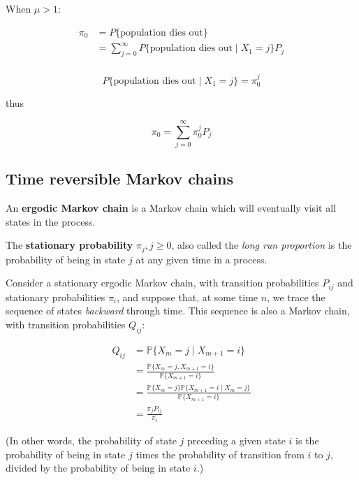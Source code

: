 \documentclass{article}
\newcommand\Prob[1]{\mathbb P\{#1\}}
\begin{document}
When $\mu > 1$:

\begin{align*}
    \pi_0 & = P\{\text{population dies out}\} \\
          & = \sum_{j=0}^\infty
          P\{\text{population dies out} \mid X_1 = j\} P_j \\
\end{align*}

\[
    P\{\text{population dies out} \mid X_1 = j\}
    = \pi_0^j
\]

thus

\[
    \pi_0 = \sum_{j=0}^\infty \pi_0^j P_j
\]


\subsection{Time reversible Markov chains}

\begin{definition}
    An \textbf{ergodic Markov chain} is a Markov chain which will
    eventually visit all states in the process.
\end{definition}

\begin{definition}
    The \textbf{stationary probability} $\pi_j, j \ge 0$, also called
    the \emph{long run proportion} is the probability of being in state
    $j$ at any given time in a process.
\end{definition}

Consider a stationary ergodic Markov chain, with transition
probabilities $P_{ij}$ and stationary probabilities $\pi_i$, and suppose
that, at some time $n$, we trace the sequence of states \emph{backward}
through time.  This sequence is also a Markov chain, with transition
probabilities $Q_{ij}$:

\begin{align*}
    Q_{ij} &= \Prob{X_m = j \mid X_{m+1} = i} \\
           &= \frac{\Prob{X_m = j, X_{m+1} = i}}
           {\Prob{X_{m+1} = i}} \\
           &= \frac{\Prob{X_m = j} \Prob{X_{m+1} = i \mid X_m = j}}
           {\Prob{X_{m+1} = i}} \\
           &= \frac{\pi_j P_{ij}}{\pi_i}
\end{align*}

(In other words, the probability of state $j$ preceding a given state
$i$ is the probability of being in state $j$ times the probability of
transition from $i$ to $j$, divided by the probability of being in state
$i$.)
\end{document}
